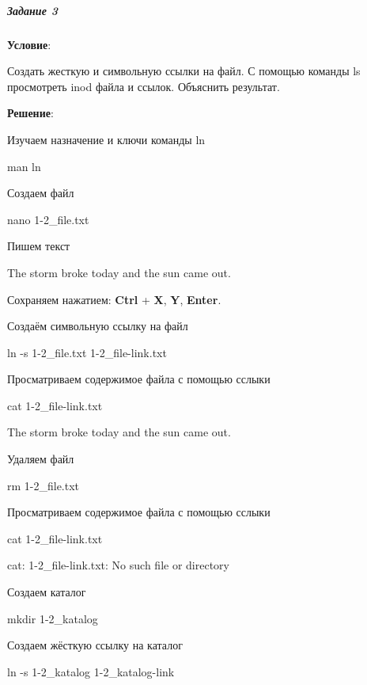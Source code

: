 \subparagraph{Задание 3} \textbf{Условие}:

Создать жесткую и символьную ссылки на файл. С помощью команды ls
просмотреть inod файла и ссылок. Объяснить результат.

\textbf{Решение}:

Изучаем назначение и ключи команды ln

\begin{BashBox}
    man ln
\end{BashBox}

Создаем файл

\begin{BashBox}
    nano 1-2_file.txt
\end{BashBox}

Пишем текст

\begin{BashBox}
    The storm broke today
    and the sun came out.
\end{BashBox}

Сохраняем нажатием: \textbf{Ctrl} + \textbf{X}, \textbf{Y}, \textbf{Enter}.

Создаём символьную ссылку на файл

\begin{BashBox}
    ln -s 1-2_file.txt 1-2_file-link.txt
\end{BashBox}

Просматриваем содержимое файла с помощью сслыки

\begin{BashBox}
    cat 1-2_file-link.txt
\end{BashBox}

\begin{OutBox}
    The storm broke today
    and the sun came out.
\end{OutBox}

Удаляем файл

\begin{BashBox}
    rm 1-2_file.txt
\end{BashBox}

Просматриваем содержимое файла с помощью сслыки

\begin{BashBox}
    cat 1-2_file-link.txt
\end{BashBox}

\begin{OutBox}
    cat: 1-2_file-link.txt: No such file or directory
\end{OutBox}

Создаем каталог

\begin{BashBox}
    mkdir 1-2_katalog
\end{BashBox}

Создаем жёсткую ссылку на каталог

\begin{BashBox}
    ln -s 1-2_katalog 1-2_katalog-link
\end{BashBox}
